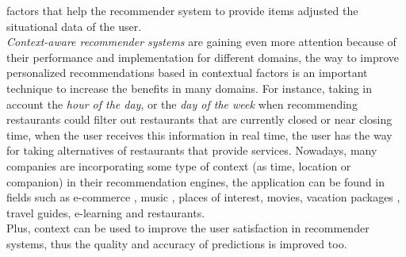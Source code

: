 factors that help the recommender system to provide items adjusted the
situational data of the user.\\
\textit{Context-aware recommender systems} are gaining even more
attention because of their performance and implementation for
different domains, the  way to improve personalized recommendations
based in contextual factors is an important technique to increase the
benefits in  many domains. For instance, taking in account the
\textit{hour of the day},  or the \textit{day of the week} when
recommending restaurants could  filter out restaurants that are
currently closed or near closing time, when the user receives this
information in real time, the user has the  way for taking
alternatives of restaurants that provide services. Nowadays, many
companies are incorporating some type of context (as time, location or
companion) in their recommendation engines, the application can be
found in fields such as e-commerce\cite{schafer1999recommender}
\cite{bulander2005enabling}, music\cite{ricci2012context}
\cite{baltrunas2011incarmusic} \cite{huq2010automated}, places of
interest\cite{baltrunas2012context},
movies\cite{eyjolfsdottir2010moviegen}, vacation
packages\cite{liu2011personalized} \cite{liu2014cocktail},  travel
guides\cite{savage2012m}, e-learning\cite{ortigosa2010entornos}  and
restaurants\cite{chu2013chinese}.\\
Plus, context can be used to improve the user satisfaction  in
recommender systems, thus the quality and accuracy of predictions  
is improved too. \\

